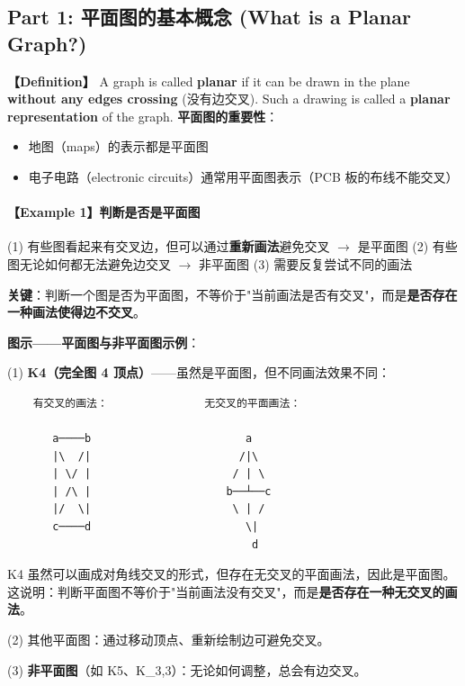 \documentclass[10pt,a4paper,openany]{ctexbook}
\theoremstyle{definition}
\theoremstyle{remark}
\renewenvironment{quote}
  {\list{}{\leftmargin=1em\rightmargin=0pt\topsep=0.5pt\partopsep=0pt}\item[]}
  {\endlist}
\begin{document}
\subsection{Part 1: 平面图的基本概念 (What is a Planar Graph?)}

\textbf{【Definition】} A graph is called \textbf{planar} if it can be drawn in the plane \textbf{without any edges crossing} (没有边交叉). Such a drawing is called a \textbf{planar representation} of the graph.
\textbf{平面图的重要性}：
\begin{itemize}
\item 地图（maps）的表示都是平面图
\item 电子电路（electronic circuits）通常用平面图表示（PCB 板的布线不能交叉）

\end{itemize}

\paragraph{【Example 1】判断是否是平面图}

(1) 有些图看起来有交叉边，但可以通过\textbf{重新画法}避免交叉 $\rightarrow$ 是平面图
(2) 有些图无论如何都无法避免边交叉 $\rightarrow$ 非平面图
(3) 需要反复尝试不同的画法
\begin{quote}
\textbf{关键}：判断一个图是否为平面图，不等价于"当前画法是否有交叉"，而是\textbf{是否存在一种画法使得边不交叉}。

\textbf{图示——平面图与非平面图示例}：

(1) \textbf{K4（完全图 4 顶点）}——虽然是平面图，但不同画法效果不同：

{\footnotesize\begin{verbatim}
    有交叉的画法：               无交叉的平面画法：

       a────b                        a
       |\  /|                       /|\
       | \/ |                      / | \
       | /\ |                     b──┴──c
       |/  \|                      \ | /
       c────d                        \|
                                      d
\end{verbatim}}


K4 虽然可以画成对角线交叉的形式，但存在无交叉的平面画法，因此是平面图。这说明：判断平面图不等价于"当前画法没有交叉"，而是\textbf{是否存在一种无交叉的画法}。

(2) 其他平面图：通过移动顶点、重新绘制边可避免交叉。

(3) \textbf{非平面图}（如 K5、K\_{3,3}）：无论如何调整，总会有边交叉。

\end{quote}
\vspace{-2pt}
\end{document}
